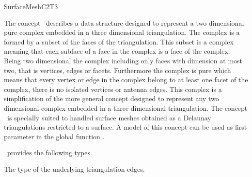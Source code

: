 

\begin{ccRefConcept}{SurfaceMeshC2T3}


\ccDefinition
  
The concept \ccRefName\ describes a data structure
designed  to represent a  two dimensional pure complex 
embedded in a three dimensional triangulation.
The complex is a  formed by a subset  of the  faces 
of the triangulation.
 This subset is a complex
meaning that each subface of a face in the complex is a face of the
complex. Being two dimensional the complex
 including only faces with dimension at most two,
that is vertices, edges or facets. 
Furthermore the complex is pure which means that
every vertex or edge in the complex belong to at least one facet of the
complex, there is no isolated vertices or antenna edges.
This complex is a simplification of the more general concept
 designed to represent any
two dimensional complex 
embedded in a three dimensional triangulation.
The concept \ccRefName\  is specially suited to handled
surface meshes obtained as a Delaunay triangulations
restricted to a surface.
A model of this concept can be used as first parameter in the global
function .


 



\ccTypes
\ccRefName\ provides the following types.

\ccGlue
{}
\ccGlue
{}
\ccGlue
{}
\ccGlue
{} {The  type of
the  underlying triangulation edges.}



\end{ccRefConcept}
